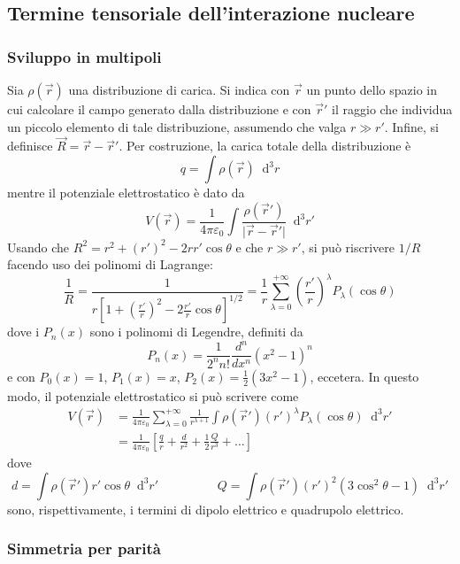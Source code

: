 \documentclass[11pt, a4paper]{scrartcl}
\theoremstyle{style}
\newcommand{\dd}{\mathop{}\!\mathrm{d}}
\numberwithin{equation}{subsection}
\begin{document}
\subsection{Termine tensoriale dell'interazione nucleare}


\subsubsection{Sviluppo in multipoli}

Sia $\rho (\vec{r})$ una distribuzione di carica.
Si indica con $\vec{r}$ un punto dello spazio in cui calcolare il campo generato dalla distribuzione e con $\vec{r}'$ il raggio che individua un piccolo elemento di tale distribuzione, assumendo che valga $r \gg r'$.
Infine, si definisce $\vec{R} = \vec{r} - \vec{r}' $.
Per costruzione, la carica totale della distribuzione \`e 
\[
q = \int \rho (\vec{r}) \dd ^3 r
\] 
mentre il potenziale elettrostatico \`e dato da 
\[
V(\vec{r}) = \frac{1}{4\pi \varepsilon _0} \int \frac{\rho (\vec{r}')}{\lvert \vec{r}-\vec{r}' \rvert } \dd ^3 r'
\] 
Usando che $R^2 = r^2 + (r')^2 - 2 r r' \cos \theta $ e che $r \gg r'$, si pu\`o riscrivere $1 / R$ facendo uso dei polinomi di Lagrange:
\[
\frac{1}{R} = \frac{1}{r \left[ 1 + \left(\frac{r'}{r}\right) ^2 - 2 \frac{r'}{r}\cos \theta  \right]^{1 / 2} } = \frac{1}{r} \sum_{\lambda =0}^{+\infty} \left(\frac{r'}{r}\right) ^\lambda  P_\lambda (\cos \theta )
\] 
dove i $P_n(x)$ sono i polinomi di Legendre, definiti da 
\[
P_n(x) = \frac{1}{2^n n!} \frac{d ^n}{d x^n} \left(x^2 - 1 \right) ^n
\] 
e con $P_0(x) = 1$, $P_1(x) = x$, $P_2(x) = \frac{1}{2}(3x^2 - 1)$, eccetera.
In questo modo, il potenziale elettrostatico si pu\`o scrivere come
\begin{equation}
	\begin{split}
		V(\vec{r}) &= \frac{1}{4 \pi \varepsilon _0} \sum_{\lambda =0}^{+\infty} \frac{1}{r^{\lambda +1}} \int \rho (\vec{r}') (r')^{\lambda } P_\lambda (\cos \theta ) \dd ^3 r'\\
			   &= \frac{1}{4\pi \varepsilon _0} \left[ \frac{q}{r} + \frac{d}{r^2} + \frac{1}{2} \frac{Q}{r^3} + \ldots \right] 
	\end{split}
\end{equation}
dove
\[
d = \int \rho (\vec{r}') r' \cos \theta  \dd ^3 r' \hspace{2cm} Q = \int \rho (\vec{r}') (r')^2 (3 \cos^2 \theta  - 1) \dd ^3 r'
\] 
sono, rispettivamente, i termini di dipolo elettrico e quadrupolo elettrico.

\subsubsection{Simmetria per parit\`a}
\end{document}

